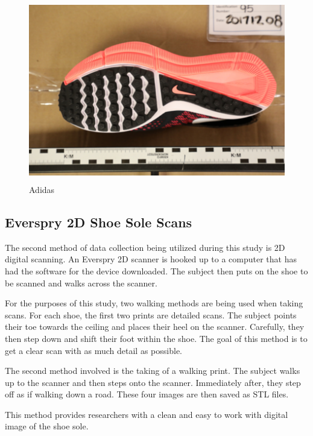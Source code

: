 \begin{figure}[!htp]
\centering
\includegraphics[width=12cm, height=8cm]{Baseline_Photo}
\caption{Adidas}
\label{Image 6}
\end{figure}



\subsection{Everspry 2D Shoe Sole Scans}

   The second method of data collection being utilized during this study is 2D digital scanning. An Everspry 2D scanner is hooked up to a computer that has had the software for the device downloaded. The subject then puts on the shoe to be scanned and walks across the scanner. 
   
   For the purposes of this study, two walking methods are being used when taking scans. For each shoe, the first two prints are detailed scans. The subject points their toe towards the ceiling and places their heel on the scanner. Carefully, they then step down and shift their foot within the shoe. The goal of this method is to get a clear scan with as much detail as possible. 
   
   The second method involved is the taking of a walking print. The subject walks up to the scanner and then steps onto the scanner. Immediately after, they step off as if walking down a road. These four images are then saved as STL files. 

   This method provides researchers with a clean and easy to work with digital image of the shoe sole. 
   

